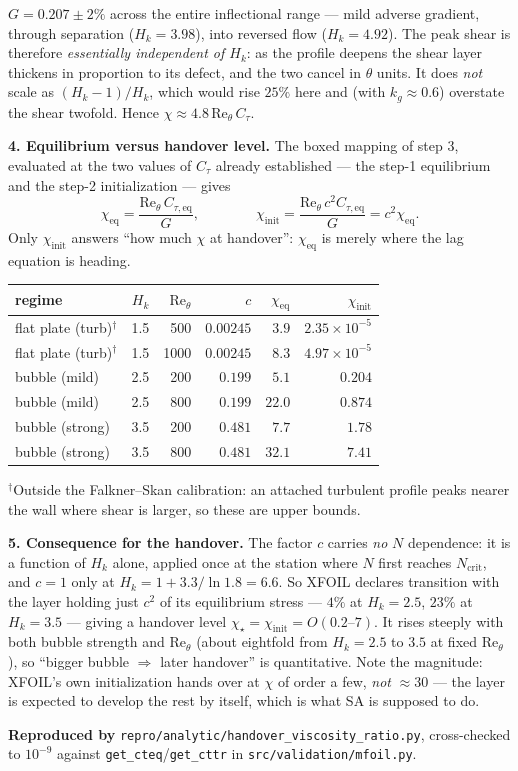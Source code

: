 \documentclass[10pt]{article}
\newcommand{\Ret}{\mathrm{Re}_\theta}
\newcommand{\Hk}{H_k}
\begin{document}
$G=0.207\pm2\%$ across the entire inflectional range --- mild adverse gradient,
through separation ($\Hk=3.98$), into reversed flow ($\Hk=4.92$). The peak shear
is therefore \emph{essentially independent of $\Hk$}: as the profile deepens the
shear layer thickens in proportion to its defect, and the two cancel in $\theta$
units. It does \emph{not} scale as $(\Hk-1)/\Hk$, which would rise $25\%$ here
and (with $k_g\approx0.6$) overstate the shear twofold. Hence
$\chi\approx4.8\,\Ret\,C_\tau$.

\textbf{4. Equilibrium versus handover level.} The boxed mapping of step 3,
evaluated at the two values of $C_\tau$ already established --- the step-1
equilibrium and the step-2 initialization --- gives
\[
\chi_{\mathrm{eq}}=\frac{\Ret\,C_{\tau,\mathrm{eq}}}{G},
\qquad\qquad
\chi_{\mathrm{init}}=\frac{\Ret\,c^{2}C_{\tau,\mathrm{eq}}}{G}=c^{2}\chi_{\mathrm{eq}} .
\]
Only $\chi_{\mathrm{init}}$ answers ``how much $\chi$ at handover'':
$\chi_{\mathrm{eq}}$ is merely where the lag equation is heading.

\vspace{-5pt}\begin{center}\small
\begin{tabular}{lrrrrr}
\toprule
regime & $\Hk$ & $\Ret$ & $c$ & $\chi_{\mathrm{eq}}$ & $\chi_{\mathrm{init}}$\\
\midrule
flat plate (turb)$^{\dagger}$ & 1.5 & 500  & $0.00245$ & $3.9$  & $2.35\times10^{-5}$\\
flat plate (turb)$^{\dagger}$ & 1.5 & 1000 & $0.00245$ & $8.3$  & $4.97\times10^{-5}$\\
bubble (mild)     & 2.5 & 200  & $0.199$ & $5.1$  & $0.204$\\
bubble (mild)     & 2.5 & 800  & $0.199$ & $22.0$ & $0.874$\\
bubble (strong)   & 3.5 & 200  & $0.481$ & $7.7$  & $1.78$\\
bubble (strong)   & 3.5 & 800  & $0.481$ & $32.1$ & $7.41$\\
\bottomrule
\end{tabular}
\end{center}\vspace{-7pt}

$^{\dagger}$Outside the Falkner--Skan calibration: an attached turbulent profile
peaks nearer the wall where shear is larger, so these are upper bounds.

\textbf{5. Consequence for the handover.} The factor $c$ carries \emph{no} $N$
dependence: it is a function of $\Hk$ alone, applied once at the station where
$N$ first reaches $N_{\mathrm{crit}}$, and $c=1$ only at
$\Hk=1+3.3/\ln1.8=6.6$. So XFOIL declares transition with the layer holding just
$c^{2}$ of its equilibrium stress --- $4\%$ at $\Hk=2.5$, $23\%$ at $\Hk=3.5$ ---
giving a handover level $\chi_\star=\chi_{\mathrm{init}}=O(0.2\text{--}7)$. It
rises steeply with both bubble strength and $\Ret$ (about eightfold from
$\Hk=2.5$ to $3.5$ at fixed $\Ret$), so ``bigger bubble $\Rightarrow$ later
handover'' is quantitative. Note the magnitude: XFOIL's own initialization hands
over at $\chi$ of order a few, \emph{not} $\approx30$ --- the layer is expected
to develop the rest by itself, which is what SA is supposed to do.

\textbf{Reproduced by} \texttt{repro/analytic/handover\_viscosity\_ratio.py},
cross-checked to $10^{-9}$ against \texttt{get\_cteq}/\texttt{get\_cttr} in
\texttt{src/validation/mfoil.py}.
\end{document}
